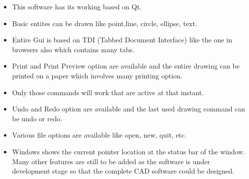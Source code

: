 \begin{itemize}
\item This software has its working based on Qt.
\item Basic entites can be drawn like point,line, circle, ellipse, text.
\item Entire Gui is based on TDI (Tabbed Document Interface) like the one in browsers also which contains many tabs.
\item Print and Print Preview option are available and the entire drawing can be printed on a paper which involves many printing option.
\item Only those commands will work that are active at that instant.
\item Undo and Redo option are available and the last used drawing command can be undo or redo.
\item Various file options are available like open, new, quit, etc.
\item Windows shows the current pointer location at the status bar of the window.\\
Many other features are still to be added as the software is under development stage so that the complete CAD software could be designed.
\end{itemize}
